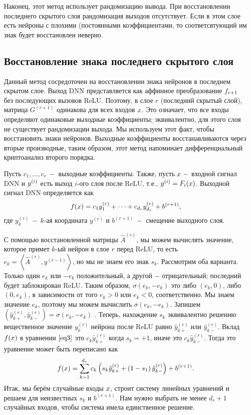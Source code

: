 Наконец, этот метод использует рандомизацию вывода. При восстановлении последнего скрытого слоя рандомизация выходов отсутствует. Если в этом слое есть нейроны с плохими (постоянными коэффициентами, то соответсвтующий им знак будет восстановлен неверно.

\subsection{Восстановление знака последнего скрытого слоя}
Данный метод сосредоточен на восстановлении знака нейронов в последнем скрытом слое. Выход DNN представляется как аффинное преобразование $\mathnormal{f}_{r+1}$ без последующих вызовов ReLU. Поэтому, в слое $r$ (последний скрытый слой), матрица $G^{\left(r+1\right)}$ одинакова для всех входов $\mathnormal{x}$. Это означает, что все входы определяют одинаковые выходные коэффициенты; эквивалентно, для этого слоя не существует рандомизации выхода. Мы используем этот факт, чтобы восстановить знаки нейронов. Выходные коэффициенты восстанавливаются через вторые производные, таким образом, этот метод напоминает дифференциальный криптоанализ второго порядка.

Пусть $c_{1}, \dots, c_{r} ~-$ выходные коэффициенты. Также, пусть $\mathnormal{x} ~-$ входной сигнал DNN и $\mathnormal{y}^{(i)}$ есть выход $i$-ого слоя после ReLU, т.е., $\mathnormal{y}^{(i)} = \mathnormal{F}_{i}(\mathnormal{x})$. Выходной сигнал DNN определяется как
\begin{equation}
	\label{eq3} \mathnormal{f(x)} = c_{1} y_{1}^{(r)} + \cdots + c_{d_{r}} y_{d_{r}}^{(r)} + b^{(r+1)},
\end{equation}
где $y_{k}^{(r)} ~-~k$-ая координата $y^{(r)}$ и $b^{(r+1)}~-$ смещение выходного слоя.

С помощью восстановленной матрицы $\hat{A}^{(r)}$, мы можем вычислять значение, которое примет $k$-ый нейрон в слое $r$ перед ReLU, то есть $e_{k} = \left \langle \hat{A}^{(r)}, y^{(r-1)} \right \rangle$, но мы не знаем его знак $s_{k}$. Рассмотрим оба варианта. Только один $e_k$ или $-e_{k}$ положительный, а другой $-$ отрицательный; последний будет заблокирован ReLU. Таким образом, $\sigma(e_{k}, -e_{k})$ это либо $(e_{k}, 0)$, либо $(0, e_{k})$, в зависимости от того $e_{k} > 0$ или $e_{k}<0$, соответственно. Мы знаем значение $e_{k}$, поэтому мы можем вычислить  $\sigma(e_{k}, -e_{k})$. Запишем $\left(\hat{y}_{k+}^{(r)},\hat{y}_{k-}^{(r)}\right) = \sigma(e_{k}, -e_{k})$ . Теперь, нахождение $s_{k}$ эквивалентно решению вещественное значение ${y}_{k}^{(r)}$ нейрона после ReLU равно $\hat{y}_{k+}^{(r)} $ или $\hat{y}_{k-}^{(r)}$. Вклад $\mathnormal{f(x)}$ в уравнении $\ref{eq3}$ это $c_{k} \hat{y}_{k+}^{(r)}$ когда $s_{k} = +1$, иначе это $c_{k} \hat{y}_{k-}^{(r)}$. Тогда это уравнение может быть переписано как
$$\mathnormal{f(x)}=\sum_{k=1}^{d_{r}}{c_{k} \left(s_{k} \hat{y}_{k+}^{(r)}+\left(1-s_{1}\right) \hat{y}_{k-}^{(r)}\right)}+b^{(r+1)}.$$
Итак, мы берём случайные входы $\mathnormal{x}$, строит систему линейных уравнений и решаем для неизвестных $s_{k}$ и $b^{(r+1)}$. Нам нужно выбрать не менее $d_{r}+1$ случайных входов, чтобы система имела единственное решение.


